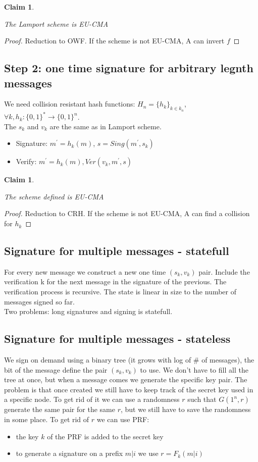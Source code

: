 \documentclass{article}
\newtheorem{clm}[thm]{Claim}
\newenvironment{claim}{\begin{clm}\begin{rm}}%
{\end{rm}\end{clm}}
\begin{document}
\begin{claim}
The Lamport scheme is EU-CMA
\end{claim}

\begin{proof}
Reduction to OWF. If the scheme is not EU-CMA, A can invert $f$
\end{proof}

\subsection{Step 2: one time signature for arbitrary legnth messages}
We need collision resistant hash functions: $H_n = \{h_k\}_{k \in k_n}$, $\forall k, h_k: \{0,1\}^* \rightarrow \{0,1\}^n$.\\ The $s_k$ and $v_k$ are the same as in Lamport scheme.
\begin{itemize}
\item Signature: $m^{'} = h_k(m)$, $s = Sing(m^{'}, s_k)$
\item Verify: $m^{'} = h_k(m), Ver(v_k,m^{'},s)$
\end{itemize}
\begin{claim}
The scheme defined is EU-CMA
\end{claim}
\begin{proof}
Reduction to CRH. If the scheme is not EU-CMA, A can find a collision for $h_k$
\end{proof}

\subsection{Signature for multiple messages - statefull}
 For every new message we construct a new one time $(s_k,v_k)$ pair. Include the verification k for the next message in the signature of the previous. The verification process is recursive. The state is linear in size to the number of messages signed so far.\\
 Two problems: long signatures and signing is statefull.
 \subsection{Signature for multiple messages - stateless}
 We sign on demand using a binary tree (it grows with log of \# of messages), the bit of the message define the pair $(s_k,v_k)$ to use. We don't have to fill all the tree at once, but when a message comes we generate the specific key pair. The problem is that once created we still have to keep track of the secret key  used in a specific node.
 To get rid of it we can use a randomness $r$ such that $G(1^n,r)$ generate the same pair for the same $r$, but we still have to save the randomness in some place. To get rid of $r$ we can use PRF:
\begin{itemize}
\item the key $k$ of the PRF is added to the secret key
\item to generate a signature on a prefix $m|i$ we use $r = F_k(m|i)$
\end{itemize}
\end{document}
